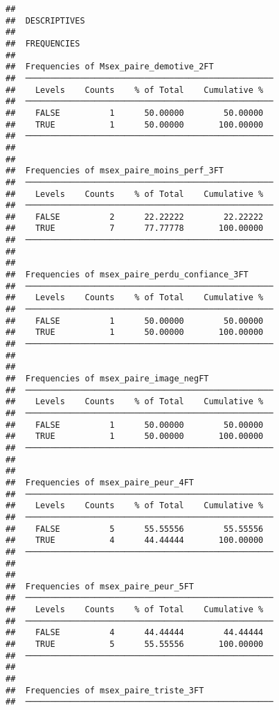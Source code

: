 \documentclass[
]{article}
\begin{document}
\begin{verbatim}
## 
##  DESCRIPTIVES
## 
##  FREQUENCIES
## 
##  Frequencies of Msex_paire_demotive_2FT             
##  ────────────────────────────────────────────────── 
##    Levels    Counts    % of Total    Cumulative %   
##  ────────────────────────────────────────────────── 
##    FALSE          1      50.00000        50.00000   
##    TRUE           1      50.00000       100.00000   
##  ────────────────────────────────────────────────── 
## 
## 
##  Frequencies of msex_paire_moins_perf_3FT           
##  ────────────────────────────────────────────────── 
##    Levels    Counts    % of Total    Cumulative %   
##  ────────────────────────────────────────────────── 
##    FALSE          2      22.22222        22.22222   
##    TRUE           7      77.77778       100.00000   
##  ────────────────────────────────────────────────── 
## 
## 
##  Frequencies of msex_paire_perdu_confiance_3FT      
##  ────────────────────────────────────────────────── 
##    Levels    Counts    % of Total    Cumulative %   
##  ────────────────────────────────────────────────── 
##    FALSE          1      50.00000        50.00000   
##    TRUE           1      50.00000       100.00000   
##  ────────────────────────────────────────────────── 
## 
## 
##  Frequencies of msex_paire_image_negFT              
##  ────────────────────────────────────────────────── 
##    Levels    Counts    % of Total    Cumulative %   
##  ────────────────────────────────────────────────── 
##    FALSE          1      50.00000        50.00000   
##    TRUE           1      50.00000       100.00000   
##  ────────────────────────────────────────────────── 
## 
## 
##  Frequencies of msex_paire_peur_4FT                 
##  ────────────────────────────────────────────────── 
##    Levels    Counts    % of Total    Cumulative %   
##  ────────────────────────────────────────────────── 
##    FALSE          5      55.55556        55.55556   
##    TRUE           4      44.44444       100.00000   
##  ────────────────────────────────────────────────── 
## 
## 
##  Frequencies of msex_paire_peur_5FT                 
##  ────────────────────────────────────────────────── 
##    Levels    Counts    % of Total    Cumulative %   
##  ────────────────────────────────────────────────── 
##    FALSE          4      44.44444        44.44444   
##    TRUE           5      55.55556       100.00000   
##  ────────────────────────────────────────────────── 
## 
## 
##  Frequencies of msex_paire_triste_3FT               
##  ────────────────────────────────────────────────── 

\end{verbatim}
\end{document}
